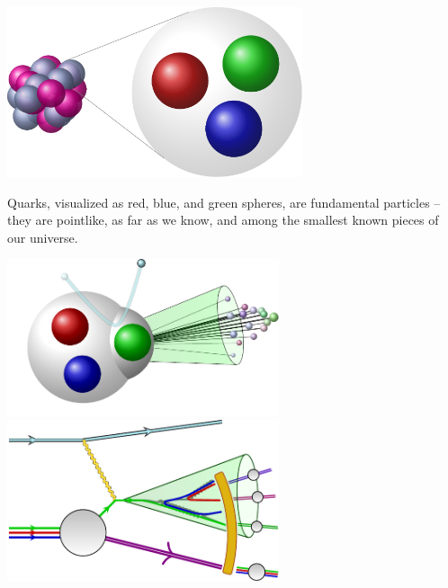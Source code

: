 \begin{sourcefigure}[t!]
    \centering
    \includegraphics[width=0.65\textwidth]{figures/picturebook/particles}
    \caption{
        Quarks, visualized as red, blue, and green spheres, are fundamental particles -- they are pointlike, as far as we know, and among the smallest known pieces of our universe.
    }
    \label{fig:picturebook_particles}
\end{sourcefigure}


\begin{sourcefigure}[t!]
    \centering
    \includegraphics[width=0.6\textwidth]{figures/picturebook/dis-1}
    \hfill
    \includegraphics[width=0.6\textwidth]{figures/picturebook/dis-2}

    \caption{
        Jets, collimated sprays of hadronic particles visualized as green cones, are formed when quarks (or gluons) are pushed out of their confines during a high-energy particle collision and undergo a cascading series of ``decays'' called the partonic cascade.
    }

    \label{fig:picturebook_jets}
\end{sourcefigure}


